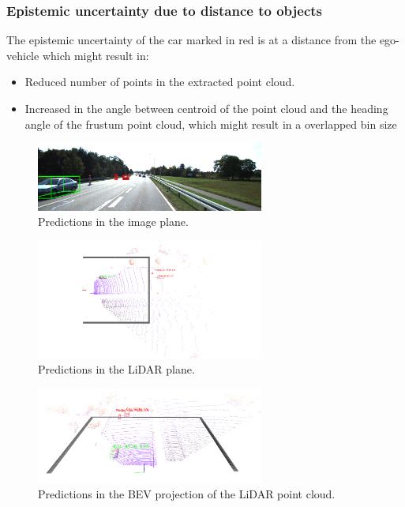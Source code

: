 \documentclass[10pt,twocolumn,letterpaper]{article}
\begin{document}
\subsubsection{Epistemic uncertainty due to distance to objects}
The epistemic uncertainty of the car marked in red is at a distance from the ego-vehicle which might result in:
        \begin{itemize}
            \item Reduced number of points in the extracted point cloud.
            \item Increased in the angle between centroid of the point cloud and the heading angle of the frustum point cloud, which might result in a overlapped bin size 
        \end{itemize}
\begin{figure}[!htbp]
        \centering
		\includegraphics[width=75mm, scale = 0.4]{images/Uncertainty_results/3535_distance_-bbox.png}
        \caption[Extracted frustum point cloud after Normalization]{Predictions in the image plane.}
        \label{fig:Uncert_blockage-1}
\end{figure}
\begin{figure}[!htbp]
        \centering
		\includegraphics[width=75mm, scale = 0.4]{images/Uncertainty_results/3535_Follow_cam_view.png}
        \caption[Extracted frustum point cloud after Normalization]{Predictions in the LiDAR plane.}
        \label{fig:Uncert_blockage-1}
\end{figure}
\begin{figure}[!htbp]
        \centering
		\includegraphics[width=75mm,scale = 0.4]{images/Uncertainty_results/3535_distance.png}
        \caption[Extracted frustum point cloud after Normalization]{Predictions in the BEV projection of the LiDAR point cloud.}
        \label{fig:Uncert_blockage-1}
\end{figure}
\end{document}

